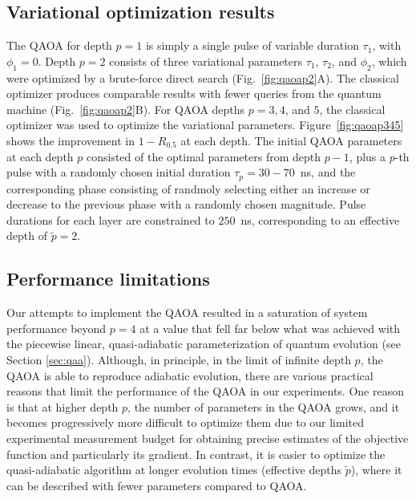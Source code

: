 \documentclass[twocolumn,amssymb,secnumarabic, prl, aps, nofootinbib]{revtex4-1}
\begin{document}
\subsection{Variational optimization results}
The QAOA for depth $p=1$ is simply a single pulse of variable duration $\tau_1$, with $\phi_1=0$. Depth $p=2$ consists of three variational parameters $\tau_1$, $\tau_2$, and $\phi_2$, which were optimized by a brute-force direct search (Fig.~\ref{fig:qaoap2}A). The classical optimizer produces comparable results with fewer queries from the quantum machine (Fig.~\ref{fig:qaoap2}B). For QAOA depths $p=3,4$, and $5$, the classical optimizer was used to optimize the variational parameters. Figure~\ref{fig:qaoap345} shows the improvement in $1-R_{0.5}$ at each depth. The initial QAOA parameters at each depth $p$ consisted of the optimal parameters from depth $p-1$, plus a $p$-th pulse with a randomly chosen initial duration $\tau_p= 30-70$~ns, and the corresponding phase consisting of randmoly selecting either an increase or decrease to the previous phase with a randomly chosen magnitude. Pulse durations for each layer are constrained to $250$~ns, corresponding to an effective depth of $\tilde{p} = 2$.


\subsection{Performance limitations}
Our attempts to implement the QAOA resulted in a saturation of system performance beyond $p=4$ at a value that fell far below what was achieved with the piecewise linear, quasi-adiabatic parameterization of quantum evolution (see Section \ref{sec:qaa}).
Although, in principle, in the limit of infinite depth $p$, the QAOA is able to reproduce adiabatic evolution, there are various practical reasons 
that limit the performance of the QAOA in our experiments.
One reason is that at higher depth $p$, the number of parameters in the QAOA grows, and it becomes progressively more difficult to optimize them due to our limited experimental measurement budget for obtaining precise estimates of the objective function and particularly its gradient.
In contrast, it is easier to optimize the quasi-adiabatic algorithm at longer evolution times (effective depths $\tilde{p}$), where it can be described with fewer parameters compared to QAOA.
\end{document}

